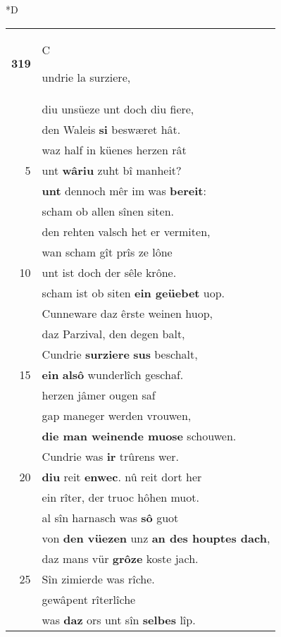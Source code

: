 \documentclass[8pt,a4paper,notitlepage]{article}
\begin{document}
\begin{table}[ht]
\begin{minipage}[t]{0.5\linewidth}
\small
\begin{center}*D
\end{center}
\begin{tabular}{rl}
\textbf{319} & \begin{large}C\end{large}undrie la surziere,\\ 
 & diu unsüeze unt doch diu fiere,\\ 
 & den Waleis \textbf{si} beswæret hât.\\ 
 & waz half in küenes herzen rât\\ 
5 & unt \textbf{wâriu} zuht bî manheit?\\ 
 & \textbf{unt} dennoch mêr im was \textbf{bereit}:\\ 
 & scham ob allen sînen siten.\\ 
 & den rehten valsch het er vermiten,\\ 
 & wan scham gît prîs ze lône\\ 
10 & unt ist doch der sêle krône.\\ 
 & scham ist ob siten \textbf{ein geüebet} uop.\\ 
 & Cunneware daz êrste weinen huop,\\ 
 & daz Parzival, den degen balt,\\ 
 & Cundrie \textbf{surziere} \textbf{sus} beschalt,\\ 
15 & \textbf{ein} \textbf{alsô} wunderlîch geschaf.\\ 
 & herzen jâmer ougen saf\\ 
 & gap maneger werden vrouwen,\\ 
 & \textbf{die man weinende muose} schouwen.\\ 
 & Cundrie was \textbf{ir} trûrens wer.\\ 
20 & \textbf{diu} reit \textbf{enwec}. nû reit dort her\\ 
 & ein rîter, der truoc hôhen muot.\\ 
 & al sîn harnasch was \textbf{sô} guot\\ 
 & von \textbf{den vüezen} unz \textbf{an des houptes dach},\\ 
 & daz mans vür \textbf{grôze} koste jach.\\ 
25 & Sîn zimierde was rîche.\\ 
 & gewâpent rîterlîche\\ 
 & was \textbf{daz} ors unt sîn \textbf{selbes} lîp.\\ 

\end{tabular}
\end{minipage}
\end{table}
\end{document}
